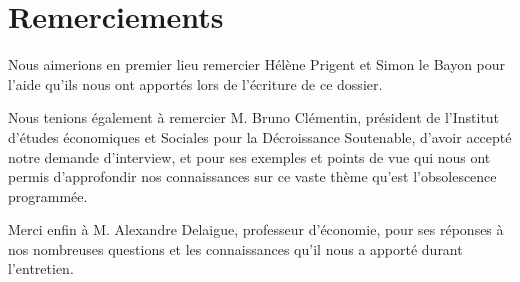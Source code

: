 
\chapter*{Remerciements}



Nous aimerions en premier lieu remercier Hélène Prigent et Simon le Bayon pour l'aide qu'ils nous ont apportés lors de l'écriture de ce dossier.

\bigbreak Nous tenions également à remercier M. Bruno Clémentin, président de l'Institut d'études économiques et Sociales pour la Décroissance Soutenable, d'avoir accepté notre demande d'interview, et pour ses exemples et points de vue qui nous ont permis d'approfondir nos connaissances sur ce vaste thème qu'est l'obsolescence programmée.

\bigbreak
Merci enfin à M. Alexandre Delaigue, professeur d'économie, pour ses réponses à nos nombreuses questions et les connaissances qu'il nous a apporté durant l'entretien.

